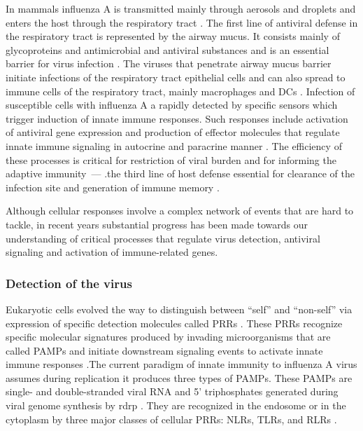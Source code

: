 	In mammals influenza A is transmitted mainly through aerosols and droplets and enters the host through the respiratory tract \parencite{Brankston2007}. The first line of antiviral defense in the respiratory tract is represented by the airway mucus. It consists mainly of glycoproteins and antimicrobial and antiviral substances and is an essential barrier for virus infection \parencite{Thornton2008, Nicholas2006}. The viruses that penetrate airway mucus barrier initiate infections of the respiratory tract epithelial cells and can also spread to immune cells of the respiratory tract, mainly macrophages and \glspl{DC} \parencite{Perrone2008, Bender1998}. Infection of susceptible cells with influenza A a rapidly detected by specific sensors which trigger induction of innate immune responses. Such responses include activation of antiviral gene expression and production of effector molecules that regulate innate immune signaling in autocrine and paracrine manner \parencite{Iwasaki2014}. The efficiency of these processes is critical for restriction of viral burden and for informing the adaptive immunity~--- .the third line of host defense essential for clearance of the infection site and generation of immune memory \parencite{Iwasaki2010}. 
	
	Although cellular responses involve a complex network of events that are hard to tackle, in recent years substantial progress has been made towards our understanding of critical processes that regulate virus detection, antiviral signaling and activation of immune-related genes.
	
		\subsubsection{Detection of the virus}
		
		Eukaryotic cells evolved the way to distinguish between ``self'' and ``non-self'' via expression of specific detection molecules called \glspl{PRR} \parencite{Janeway2002}. These \glspl{PRR} recognize specific molecular signatures produced by invading microorganisms that are called  \glspl{PAMP} and initiate downstream signaling events to activate innate immune responses \parencite{Janeway1989}.The current paradigm of innate immunity to influenza A virus assumes during replication it produces three types of  \glspl{PAMP}. These \glspl{PAMP} are single- and double-stranded viral RNA and 5' triphosphates generated during viral genome synthesis by \gls{rdrp} \parencite{Guillot2005, Hornung2006, Kato2006, Lund2004}. They are recognized in the endosome or in the cytoplasm by three major classes of cellular \glspl{PRR}: \glspl{NLR}, \glspl{TLR}, and \glspl{RLR} \parencite{Iwasaki2014}. 
		
